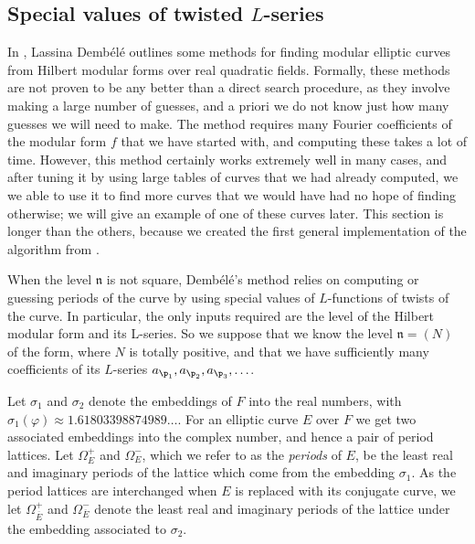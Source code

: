 \documentclass{amsart}
\newcommand{\n}{\mathfrak{n}}
\newcommand{\ap}[1]{a_{\p_{#1}}}
\newcommand{\Ebar}{\overline{E}}
\newcommand{\dembele}{Demb\'el{\'e}\xspace}
\begin{document}
\subsection{Special values of twisted $L$-series}\label{sec:specialvalues}
\newcommand{\Omegap}{\Omega^+}
\newcommand{\Omegam}{\Omega^-}
\newcommand{\Omegapp}{\Omega^{++}}
\newcommand{\Omegapm}{\Omega^{+-}}
\newcommand{\Omegamp}{\Omega^{-+}}
\newcommand{\Omegamm}{\Omega^{--}}
\newcommand{\OmegammEguess}{\Omega^{--}_{E, \mathrm{guess}}}
\newcommand{\OmegampEguess}{\Omega^{-+}_{E, \mathrm{guess}}}
\newcommand{\OmegapmEguess}{\Omega^{+-}_{E, \mathrm{guess}}}
\newcommand{\OmegappEguess}{\Omega^{++}_{E, \mathrm{guess}}}

In \cite{dembele:elliptic-curves-quadratic-fields}, Lassina \dembele
outlines some methods for finding modular elliptic curves from Hilbert
modular forms over real quadratic fields. Formally, these methods are
not proven to be any better than a direct search procedure, as they
involve making a large number of guesses, and a priori we do not know
just how many guesses we will need to make.  The method requires many
Fourier coefficients of the modular form $f$ that we have started
with, and computing these takes a lot of time. However, this method
certainly works extremely well in many cases, and after tuning it by
using large tables of curves that we had already computed, we we able
to use it to find more curves that we would have had no hope of
finding otherwise; we will give an example of one of these curves
later.  This section is longer than the others, because we created the
first general implementation of the algorithm from
\cite{dembele:elliptic-curves-quadratic-fields}.

When the level $\n$ is not square, \dembele's method relies on computing
or guessing periods of the curve by using special values of
$L$-functions of twists of the curve. In particular, the only inputs
required are the level of the Hilbert modular form and its L-series. So
we suppose that we know the level $\n = (N)$ of the form, where $N$ is
totally positive, and that we have sufficiently many coefficients of its
$L$-series $\ap{1}, \ap{2}, \ap{3}, \ldots$.

Let $\sigma_1$ and $\sigma_2$ denote the embeddings of $F$ into the
real numbers, with $\sigma_1(\varphi) \approx 1.61803398874989\ldots$. For
an elliptic curve $E$ over $F$ we get two associated embeddings into
the complex number, and hence a pair of period lattices. Let $\Omegap_E$
and $\Omegam_E$, which we refer to as the {\em periods} of $E$,
be the least real and imaginary periods of the lattice
which come from the embedding $\sigma_1$. As the period lattices are interchanged
when $E$ is replaced with its conjugate curve, we let $\Omegap_{\Ebar}$
and $\Omegam_{\Ebar}$ denote the least real and imaginary periods
of the lattice under the embedding associated to $\sigma_2$.
\end{document}
